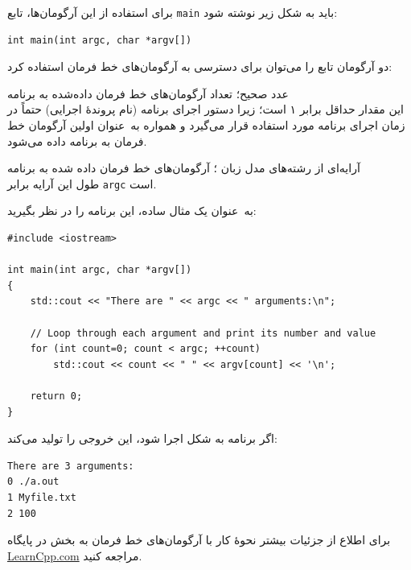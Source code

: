 \documentclass{utap}
\renewcommand{\labelitemi}{$\circ$}
\begin{document}
    برای استفاده از این آرگومان‌ها، تابع \lstinline{main} باید به شکل زیر نوشته شود:
    \begin{latin}\begin{lstlisting}
int main(int argc, char *argv[])
    \end{lstlisting}\end{latin}

    دو آرگومان تابع
 را می‌توان برای دسترسی به آرگومان‌های خط فرمان استفاده کرد:
    \begin{description}[leftmargin=5em,style=nextline,font=\labelitemi\quad\bfseries]
        \item[\lr{\texttt{argc}}] عدد صحیح؛ تعداد آرگومان‌های خط فرمان داده‌شده به برنامه\\
        این مقدار حداقل برابر ۱ است؛ زیرا دستور اجرای برنامه (نام پروندهٔ اجرایی) حتماً در زمان اجرای برنامه مورد استفاده قرار می‌گیرد و همواره به~عنوان اولین آرگومان خط فرمان به برنامه داده می‌شود.
        \item[\lr{\texttt{argv}}] آرایه‌ای از رشته‌های مدل زبان ؛ آرگومان‌های خط فرمان داده شده به برنامه\\
        طول این آرایه برابر \lstinline{argc} است.
    \end{description}

    به~عنوان یک مثال ساده، این برنامه را در نظر بگیرید:
    \begin{latin}\begin{lstlisting}
#include <iostream>
 
int main(int argc, char *argv[])
{
    std::cout << "There are " << argc << " arguments:\n";
 
    // Loop through each argument and print its number and value
    for (int count=0; count < argc; ++count)
        std::cout << count << " " << argv[count] << '\n';
 
    return 0;
}

    \end{lstlisting}\end{latin}

    اگر برنامه به شکل  اجرا شود، این خروجی را تولید می‌کند:
    \begin{latin}%
    \begin{Verbatim}[fontsize=\small]
There are 3 arguments:
0 ./a.out
1 Myfile.txt
2 100
    \end{Verbatim}
    \end{latin}

    برای اطلاع از جزئیات بیشتر نحوهٔ کار با آرگومان‌های خط فرمان به بخش \href{https://www.learncpp.com/cpp-tutorial/713-command-line-arguments/}{} در پایگاه \url{LearnCpp.com} مراجعه کنید.
\end{document}
